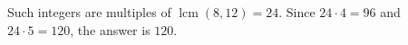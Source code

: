 Such integers are multiples of $\operatorname{lcm}(8,12)=24$. Since $24\cdot4=96$ and $24\cdot5=120$, the answer is $\boxed{120}$.
